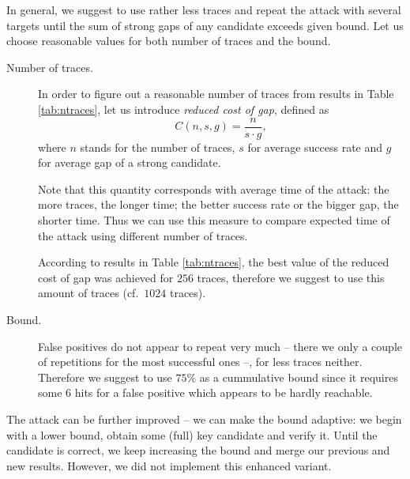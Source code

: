 In general, we suggest to use rather less traces and repeat the attack with several targets until the sum of strong gaps of any candidate exceeds given bound. Let us choose reasonable values for both number of traces and the bound.
\begin{description}
	\item[Number of traces.]
		In order to figure out a reasonable number of traces from results in Table \ref{tab:ntraces}, let us introduce {\em reduced cost of gap}, defined as
		\begin{equation}
		\label{eq:redcost}
			C(n, s, g) = \frac{n}{s\cdot g} ,
		\end{equation}
		where $n$ stands for the number of traces, $s$ for average success rate and $g$ for average gap of a strong candidate.
		
		Note that this quantity corresponds with average time of the attack: the more traces, the longer time; the better success rate or the bigger gap, the shorter time. Thus we can use this measure to compare expected time of the attack using different number of traces.
		
		According to results in Table \ref{tab:ntraces}, the best value of the reduced cost of gap was achieved for $256$ traces, therefore we suggest to use this amount of traces (cf.\ $1024$ traces).
	\item[Bound.]
		False positives do not appear to repeat very much -- there we only a couple of repetitions for the most successful ones --, for less traces neither. Therefore we suggest to use $75\%$ as a cummulative bound since it requires some $6$ hits for a false positive which appears to be hardly reachable.
\end{description}

The attack can be further improved -- we can make the bound adaptive: we begin with a lower bound, obtain some (full) key candidate and verify it. Until the candidate is correct, we keep increasing the bound and merge our previous and new results. However, we did not implement this enhanced variant.

